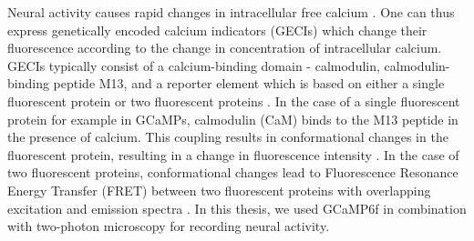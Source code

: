 Neural activity causes rapid changes in intracellular free calcium \parencite{Baker1971, Sabatini2002, Egelhaaf1995}. One can thus express genetically encoded calcium indicators (GECIs) which change their fluorescence according to the change in concentration of intracellular calcium. GECIs typically consist of a calcium-binding domain - calmodulin, calmodulin-binding peptide M13, and a reporter element which is based on either a single fluorescent protein or two fluorescent proteins \parencite{Broussard2014}. In the case of a single fluorescent protein for example in GCaMPs, calmodulin (CaM) binds to the M13 peptide in the presence of calcium. This coupling results in conformational changes in the fluorescent protein, resulting in a change in fluorescence intensity \parencite{Nagai2001}. In the case of two fluorescent proteins, conformational changes lead to Fluorescence Resonance Energy Transfer (FRET) between two fluorescent proteins with overlapping excitation and emission spectra \parencite{Miyawaki1997}. In this thesis, we used GCaMP6f  \parencite{Chen2013} in combination with two-photon microscopy for recording neural activity.



